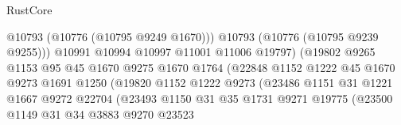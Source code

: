 \begin{lexlean}{RustCore}
\begin{coremodule}
                                            @10793
                                            (@10776 (@10795 @9249 @1670)))
                                          @10793
                                          (@10776 (@10795 @9239 @9255)))
                                        @10991
                                        @10994
                                        @10997
                                        @11001
                                        @11006
                                        @19797)
                                      (@19802
                                        @9265
                                        @1153
                                        @95
                                        @45
                                        @1670
                                        @9275
                                        @1670
                                        @1764
                                        (@22848
                                          @1152
                                          @1222
                                          @45
                                          @1670
                                          @9273
                                          @1691
                                          @1250
                                          (@19820
                                            @1152
                                            @1222
                                            @9273
                                            (@23486
                                              @1151
                                              @31
                                              @1221
                                              @1667
                                              @9272
                                              @22704
                                              (@23493
                                                @1150
                                                @31
                                                @35
                                                @1731
                                                @9271
                                                @19775
                                                (@23500
                                                  @1149
                                                  @31
                                                  @34
                                                  @3883
                                                  @9270
                                                  @23523

\end{coremodule}
\end{lexlean}
